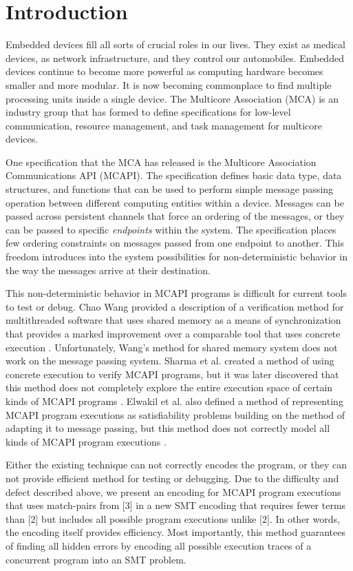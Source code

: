 \section{Introduction}
Embedded devices fill all sorts of crucial roles in our lives. They exist as
medical devices, as network infrastructure, and they control our automobiles.
Embedded devices continue to become more powerful as computing hardware becomes
smaller and more modular. It is now becoming commonplace to find multiple
processing units inside a single device. The Multicore Association (MCA) is an
industry group that has formed to define specifications for low-level
communication, resource management, and task management for
multicore devices.

One specification that the MCA has released is the Multicore Association
Communications API (MCAPI). The specification defines basic data type, data
structures, and functions that can be used to perform simple message passing
operation between different computing entities within a device. Messages can be
passed across persistent channels that force an ordering of the messages, or
they can be passed to specific \emph{endpoints} within the system. The specification places few ordering constraints on messages passed from one
endpoint to another. This freedom introduces into the system possibilities for
non-deterministic behavior in the way the messages arrive at their destination.

This non-deterministic behavior in MCAPI programs is difficult for current tools to test or debug.
Chao Wang provided a description of a verification method for
multithreaded software that uses shared memory as a means of synchronization that provides a marked improvement over a comparable tool that uses concrete execution \cite{wang:fse09}. Unfortunately, Wang's method for shared memory system does not work on the message passing system.
Sharma et al. created a method of using concrete execution to verify MCAPI
programs, but it was later discovered that this method does not completely
explore the entire execution space of certain kinds of MCAPI programs \cite{sharma:fmcad09}. Elwakil
et al. also defined a method of representing MCAPI program executions as
satisfiability problems building on the method of \cite{wang:fse09} adapting it to message passing, but this method does not correctly model all kinds of
MCAPI program executions \cite{elwakil:padtad10}.

Either the existing technique can not correctly encodes the program, or they can not provide efficient method for testing or debugging.
Due to the difficulty and defect described above, %
we present an encoding for MCAPI program executions that uses match-pairs from [3] in a new SMT encoding that requires fewer terms than [2] but includes all possible program executions unlike [2]. In other words, the encoding itself provides efficiency. Most importantly, this method guarantees of finding all hidden errors by encoding all possible execution traces of a concurrent program into an SMT problem.


